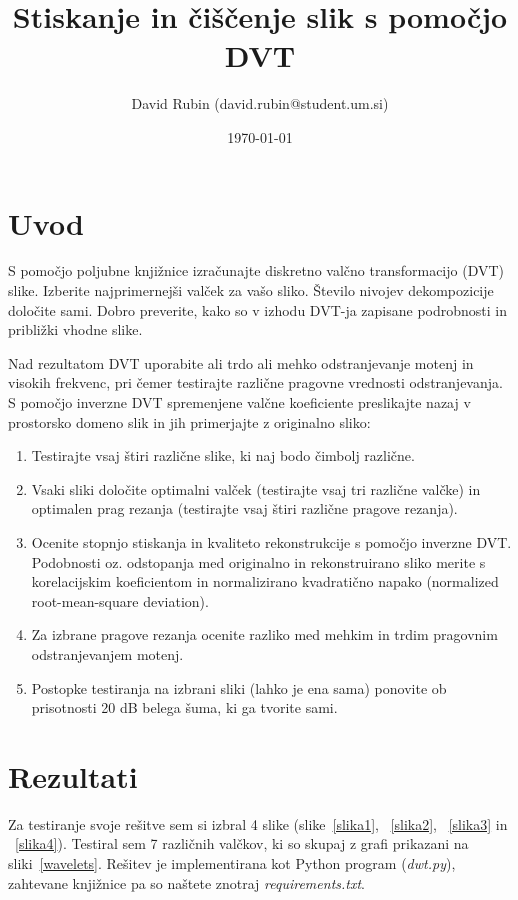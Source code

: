 \documentclass[a4paper,11pt]{article}
\title{Stiskanje in čiščenje slik s pomočjo DVT}
\author{David Rubin (david.rubin@student.um.si)}
\date{\today}
\begin{document}
\maketitle

\section{Uvod}

S pomočjo poljubne knjižnice izračunajte diskretno valčno transformacijo (DVT) slike. Izberite najprimernejši valček za vašo sliko. Število nivojev dekompozicije določite sami. Dobro preverite, kako so v izhodu DVT-ja zapisane podrobnosti in približki vhodne slike. 

Nad rezultatom DVT uporabite ali trdo ali mehko odstranjevanje motenj in visokih frekvenc, pri čemer testirajte različne pragovne vrednosti odstranjevanja. S pomočjo inverzne DVT spremenjene valčne koeficiente preslikajte nazaj v prostorsko domeno slik in jih primerjajte z originalno  sliko:
\begin{enumerate}
\item Testirajte vsaj štiri različne slike, ki naj bodo čimbolj različne. 
\item Vsaki sliki določite optimalni valček (testirajte vsaj tri različne valčke) in optimalen prag rezanja (testirajte vsaj štiri različne pragove rezanja). 
\item Ocenite stopnjo stiskanja in kvaliteto rekonstrukcije s pomočjo inverzne  DVT. Podobnosti oz. odstopanja med originalno in rekonstruirano sliko merite s korelacijskim koeficientom in normalizirano kvadratično napako (normalized root-mean-square deviation).
\item Za izbrane pragove rezanja ocenite razliko med mehkim in trdim pragovnim odstranjevanjem motenj. 
\item Postopke testiranja na izbrani sliki (lahko je ena sama) ponovite ob prisotnosti 20 dB belega šuma, ki ga tvorite sami.
\end{enumerate}

\section{Rezultati}

Za testiranje svoje rešitve sem si izbral 4 slike (slike~\ref{slika1}, ~\ref{slika2}, ~\ref{slika3} in ~\ref{slika4}). Testiral sem 7 različnih valčkov, ki so skupaj z grafi prikazani na sliki~\ref{wavelets}. Rešitev je implementirana kot Python program (\textit{dwt.py}), zahtevane knjižnice pa so naštete znotraj \textit{requirements.txt}.
\end{document}
